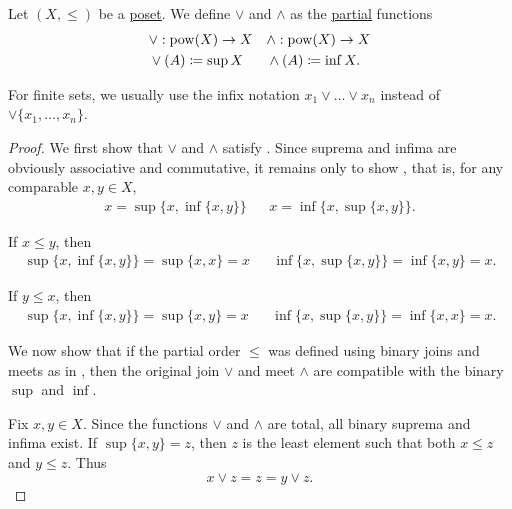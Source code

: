 \begin{definition}\label{def:join_meet}
  Let \( (X, \leq) \) be a \hyperref[def:poset]{poset}. We define  \( \vee \) and  \( \wedge \) as the \hyperref[def:function/partial]{partial} functions
  \begin{align*}
    &\vee: \operatorname{pow}(X) \to X
    &&\wedge: \operatorname{pow}(X) \to X
    \\
    &\vee(A) \coloneqq \sup X
    &&\wedge(A) \coloneqq \inf X.
  \end{align*}

  For finite sets, we usually use the infix notation \( x_1 \vee \ldots \vee x_n \) instead of \( \vee \{ x_1, \ldots, x_n \} \).
\end{definition}
\begin{proof}
  We first show that \( \vee \) and \( \wedge \) satisfy . Since suprema and infima are obviously associative and commutative, it remains only to show , that is, for any comparable \( x, y \in X \),
  \begin{align*}
    x = \sup \{x, \inf \{ x, y \} \}
    &&
    x = \inf \{x, \sup \{ x, y \} \}.
  \end{align*}

  If \( x \leq y \), then
  \begin{align*}
    \sup \{ x, \inf \{ x, y \} \} = \sup \{ x, x \} = x
    &&
    \inf \{ x, \sup \{ x, y \} \} = \inf \{ x, y \} = x.
  \end{align*}

  If \( y \leq x \), then
  \begin{align*}
    \sup \{ x, \inf \{ x, y \} \} = \sup \{ x, y \} = x
    &&
    \inf \{ x, \sup \{ x, y \} \} = \inf \{ x, x \} = x.
  \end{align*}

  We now show that if the partial order \( \leq \) was defined using binary joins and meets as in , then the original join \( \vee \) and meet \( \wedge \) are compatible with the binary \( \sup \) and \( \inf \).

  Fix \( x, y \in X \). Since the functions \( \vee \) and \( \wedge \) are total, all binary suprema and infima exist. If \( \sup \{ x, y \} = z \), then \( z \) is the least element such that both \( x \leq z \) and \( y \leq z \). Thus
  \begin{equation*}
    x \vee z = z = y \vee z.
  \end{equation*}


\end{proof}
